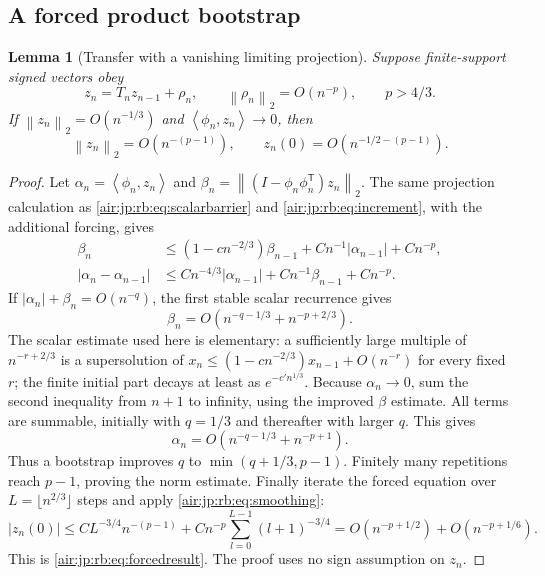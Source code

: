 \documentclass[11pt,letterpaper]{article}
\numberwithin{equation}{section}
\newtheorem{lemma}[theorem]{Lemma}
\theoremstyle{remark}
\newcommand{\norm}[1]{\left\lVert#1\right\rVert}
\newcommand{\ip}[2]{\left\langle#1,#2\right\rangle}
\begin{document}
\subsection{A forced product bootstrap}
\begin{lemma}[Transfer with a vanishing limiting projection]\label{air:jp:rb:lem:forced}
Suppose finite-support signed vectors obey
\[
 z_n=T_nz_{n-1}+\rho_n,\qquad \norm{\rho_n}_2=O(n^{-p}),\qquad p>4/3.
\]
If $\norm{z_n}_2=O(n^{-1/3})$ and $\ip{\phi_n}{z_n}\to0$, then
\begin{equation}\label{air:jp:rb:eq:forcedresult}
 \norm{z_n}_2=O(n^{-(p-1)}),\qquad
 z_n(0)=O(n^{-1/2-(p-1)}).
\end{equation}
\end{lemma}
\begin{proof}
Let $\alpha_n=\ip{\phi_n}{z_n}$ and
$\beta_n=\norm{(I-\phi_n\phi_n^{\mathsf T})z_n}_2$.
The same projection calculation as \eqref{air:jp:rb:eq:scalarbarrier} and \eqref{air:jp:rb:eq:increment}, with the additional forcing, gives
\begin{align*}
 \beta_n&\le(1-cn^{-2/3})\beta_{n-1}
              +Cn^{-1}|\alpha_{n-1}|+Cn^{-p},\\
 |\alpha_n-\alpha_{n-1}|&\le Cn^{-4/3}|\alpha_{n-1}|
              +Cn^{-1}\beta_{n-1}+Cn^{-p}.
\end{align*}
If $|\alpha_n|+\beta_n=O(n^{-q})$, the first stable scalar recurrence gives
\[
 \beta_n=O(n^{-q-1/3}+n^{-p+2/3}).
\]
The scalar estimate used here is elementary: a sufficiently large multiple of $n^{-r+2/3}$ is a supersolution of
$x_n\le(1-cn^{-2/3})x_{n-1}+O(n^{-r})$ for every fixed $r$; the finite initial part decays at least as $e^{-c'n^{1/3}}$.
Because $\alpha_n\to0$, sum the second inequality from $n+1$ to infinity, using the improved $\beta$ estimate. All terms are summable, initially with $q=1/3$ and thereafter with larger $q$. This gives
\[
 \alpha_n=O(n^{-q-1/3}+n^{-p+1}).
\]
Thus a bootstrap improves $q$ to $\min(q+1/3,p-1)$. Finitely many repetitions reach $p-1$, proving the norm estimate. Finally iterate the forced equation over $L=\lfloor n^{2/3}\rfloor$ steps and apply \eqref{air:jp:rb:eq:smoothing}:
\[
 |z_n(0)|\le CL^{-3/4}n^{-(p-1)}
    +Cn^{-p}\sum_{l=0}^{L-1}(l+1)^{-3/4}
 =O(n^{-p+1/2})+O(n^{-p+1/6}).
\]
This is \eqref{air:jp:rb:eq:forcedresult}. The proof uses no sign assumption on $z_n$.
\end{proof}
\end{document}
